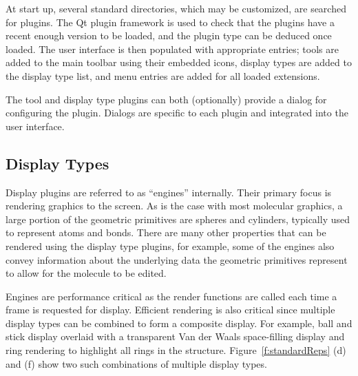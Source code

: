 \documentclass[10pt]{bmc_article}
\newenvironment{bmcformat}{\begin{raggedright}
\baselineskip20pt\sloppy\setboolean{publ}{false}}{\end{raggedright}
\baselineskip20pt\sloppy}
\begin{document}
\begin{bmcformat}
At start up, several standard directories, which may be customized, are searched
for plugins. The Qt plugin framework is used to check that the plugins have a
recent enough version to be loaded, and the plugin type can be deduced once
loaded. The user interface is then populated with appropriate entries; tools are
added to the main toolbar using their embedded icons, display types are added to
the display type list, and menu entries are added for all loaded extensions.

The tool and display type plugins can both (optionally) provide a
dialog for configuring the plugin. Dialogs are specific to each plugin
and integrated into the user interface.

\subsection{Display Types}

Display plugins are referred to as ``engines'' internally. Their
primary focus is rendering graphics to the screen. As is the case with most
molecular graphics, a large portion of the geometric primitives are spheres and
cylinders, typically used to represent atoms and bonds. There are many other
properties that can be rendered using the display type plugins, for example,
some of the engines also convey information about the underlying data the
geometric primitives represent to allow for the molecule to be edited.

Engines are performance critical as the render functions are called each time a
frame is requested for display.  Efficient rendering is also critical
since multiple display types can be combined to form a composite display. For
example, ball and stick display overlaid with a transparent Van der Waals
space-filling display and ring rendering to highlight all rings in the
structure. Figure~\ref{f:standardReps} (d) and (f) show two such combinations of
multiple display types.


\end{bmcformat}
\end{document}
